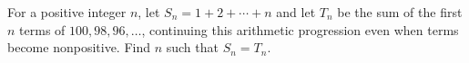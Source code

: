 For a positive integer $n$, let $S_n=1+2+\cdots+n$ and let $T_n$ be the sum of the first $n$ terms of $100,98,96,\ldots$, continuing this arithmetic progression even when terms become nonpositive. Find $n$ such that $S_n=T_n$.
